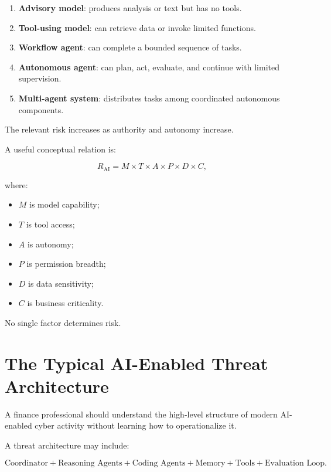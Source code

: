 \begin{enumerate}
    \item \textbf{Advisory model}: produces analysis or text but has no tools.
    \item \textbf{Tool-using model}: can retrieve data or invoke limited functions.
    \item \textbf{Workflow agent}: can complete a bounded sequence of tasks.
    \item \textbf{Autonomous agent}: can plan, act, evaluate, and continue with limited supervision.
    \item \textbf{Multi-agent system}: distributes tasks among coordinated autonomous components.
\end{enumerate}

The relevant risk increases as authority and autonomy increase.

A useful conceptual relation is:

\begin{equation}
R_{\text{AI}}
=
M
\times
T
\times
A
\times
P
\times
D
\times
C,
\end{equation}

where:

\begin{itemize}
    \item \(M\) is model capability;
    \item \(T\) is tool access;
    \item \(A\) is autonomy;
    \item \(P\) is permission breadth;
    \item \(D\) is data sensitivity;
    \item \(C\) is business criticality.
\end{itemize}

No single factor determines risk.

\section{The Typical AI-Enabled Threat Architecture}

A finance professional should understand the high-level structure of modern AI-enabled cyber activity without learning how to operationalize it.

A threat architecture may include:

\begin{equation}
\text{Coordinator}
+
\text{Reasoning Agents}
+
\text{Coding Agents}
+
\text{Memory}
+
\text{Tools}
+
\text{Evaluation Loop}.
\end{equation}


